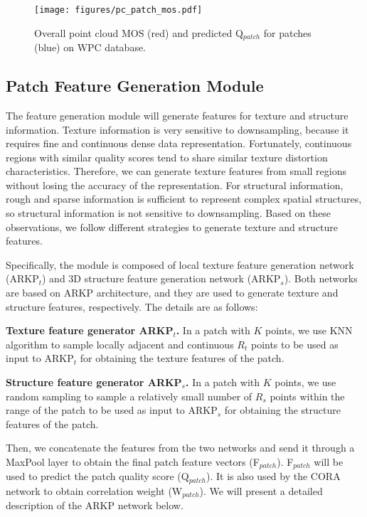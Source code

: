 \documentclass[conference]{IEEEtran}
\begin{document}
\begin{figure}[t]       \begin{center}
    \texttt{[image: figures/pc\_patch\_mos.pdf]}
\end{center}
\vspace{-0.2cm}
   \caption{Overall point cloud MOS (red) and predicted Q$_{patch}$ for patches (blue) on WPC database.}
\label{fig:pc_patch_mos}
\end{figure}



\subsection{Patch Feature Generation Module}
The feature generation module will generate features for texture and structure information. Texture information is very sensitive to downsampling, because it requires fine and continuous dense data representation. Fortunately, continuous regions with similar quality scores tend to share similar texture distortion characteristics. Therefore, we can generate texture features from small regions without losing the accuracy of the representation. For structural information, rough and sparse information is sufficient to represent complex spatial structures, so structural information is not sensitive to downsampling. Based on these observations, we follow different strategies to generate texture and structure features.

Specifically, the module is composed of local texture feature generation network (ARKP$_{t}$) and 3D structure feature generation network (ARKP$_{s}$). Both networks are based on ARKP architecture, and they are used to generate texture and structure features, respectively. The details are as follows:

\textbf{Texture feature generator ARKP$_{t}$.} 
In a patch with $K$ points, we use KNN algorithm to sample locally adjacent and continuous $R_{t}$ points to be used as input to ARKP$_{t}$ for obtaining the texture features of the patch.

\textbf{Structure feature generator ARKP$_{s}$.} 
In a patch with $K$ points, we use random sampling to sample a relatively small number of $R_{s}$ points within the range of the patch to be used as input to ARKP$_{s}$ for obtaining the structure features of the patch.

Then, we concatenate the features from the two networks and send it through a MaxPool layer to obtain the final patch feature vectors (F$_{patch}$). F$_{patch}$ will be used to predict the patch quality score (Q$_{patch}$). It is also used by the CORA network to obtain correlation weight (W$_{patch}$). We will present a detailed description of the ARKP network below.
\end{document}
